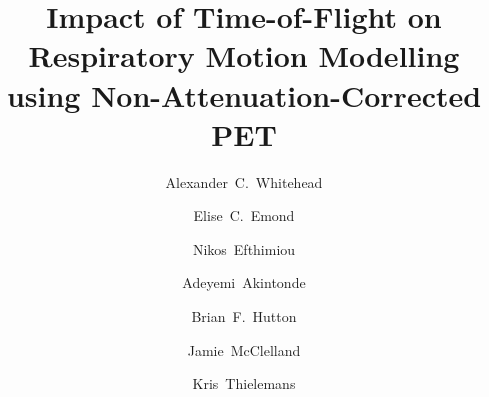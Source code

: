 \documentclass[portrait,color=UCLburgundy,margin=2cm]{uclposter}
\begin{document}
\title{Impact of Time-of-Flight on Respiratory Motion Modelling using Non-Attenuation-Corrected PET}

\author[1,2 *]{Alexander~C.~Whitehead}
\author[1]{Elise~C.~Emond}
\author[3]{Nikos~Efthimiou}
\author[1,2]{Adeyemi~Akintonde}
\author[1]{Brian~F.~Hutton}
\author[2]{\newline Jamie~McClelland}
\author[1]{Kris~Thielemans}


\maketitle
\end{document}
